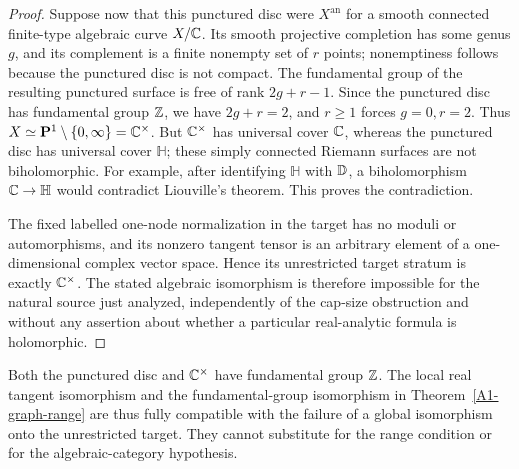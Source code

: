 \begin{proof}
Suppose now that this punctured disc were $X^{\mathrm{an}}$ for a
smooth connected finite-type algebraic curve $X/{\mathbb{C}}$. Its smooth
projective completion has some genus $g$, and its complement is a
finite nonempty set of $r$ points; nonemptiness follows because
the punctured disc is not compact. The fundamental group of the
resulting punctured surface is free of rank $2g+r-1$. Since the
punctured disc has fundamental group ${\mathbb{Z}}$, we have $2g+r=2$,
and $r\ge1$ forces $g=0,r=2$. Thus $X\simeq\mathbf P^1\setminus
\{0,\infty\}={\mathbb{C}}^\times$. But ${\mathbb{C}}^\times$ has universal cover
${\mathbb{C}}$, whereas the punctured disc has universal cover $\mathbb H$;
these simply connected Riemann surfaces are not biholomorphic.
For example, after identifying $\mathbb H$ with ${\mathbb{D}}$, a
biholomorphism ${\mathbb{C}}\to\mathbb H$ would contradict Liouville's
theorem. This proves the contradiction.

The fixed labelled one-node normalization in the target has no
moduli or automorphisms, and its nonzero tangent tensor is an
arbitrary element of a one-dimensional complex vector space.
Hence its unrestricted target stratum is exactly ${\mathbb{C}}^\times$.
The stated algebraic isomorphism is therefore impossible for the
natural source just analyzed, independently of the cap-size
obstruction and without any assertion about whether a particular
real-analytic formula is holomorphic.
\end{proof}

Both the punctured disc and ${\mathbb{C}}^\times$ have fundamental group
${\mathbb{Z}}$. The local real tangent isomorphism and the fundamental-group
isomorphism in Theorem~\ref{A1-graph-range} are thus fully
compatible with the failure of a global isomorphism onto the
unrestricted target. They cannot substitute for the range
condition or for the algebraic-category hypothesis.
